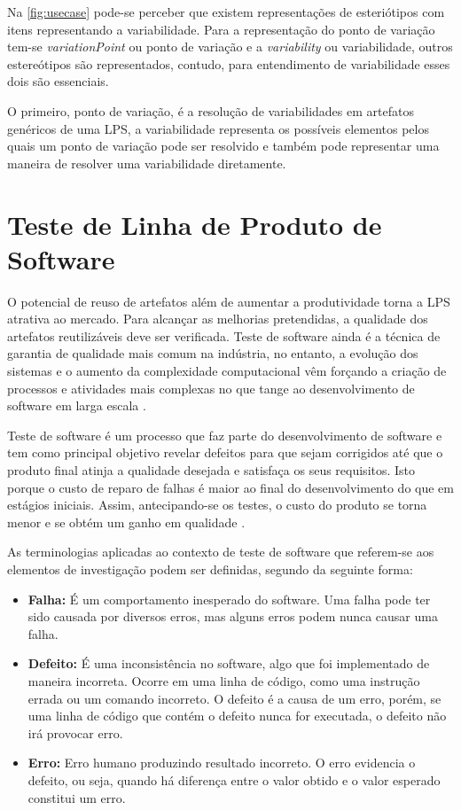 Na \ref{fig:usecase} pode-se perceber que existem representações de esteriótipos com itens representando a variabilidade. Para a representação do ponto de variação tem-se \textit{variationPoint} ou ponto de variação e a \textit{variability} ou variabilidade, outros estereótipos são representados, contudo, para entendimento de variabilidade esses dois são essenciais.

O primeiro, ponto de variação, é a resolução de variabilidades em artefatos genéricos de uma LPS, a variabilidade representa os possíveis elementos pelos quais um ponto de variação pode ser resolvido e também pode representar uma maneira de resolver uma variabilidade diretamente.    



\section{Teste de Linha de Produto de Software}
\label{cap2sec:teste_lps}

O potencial de reuso de artefatos além de aumentar a produtividade torna a LPS atrativa ao mercado. Para alcançar as melhorias pretendidas, a qualidade dos artefatos reutilizáveis deve ser verificada. Teste de software ainda é a técnica de garantia de qualidade mais comum na indústria, no entanto, a evolução dos sistemas e o aumento da complexidade computacional vêm forçando a criação de processos e atividades mais complexas no que tange ao desenvolvimento de software em larga escala \cite{Apel:2013:FSP:2541773}. 

Teste de software é um processo que faz parte do desenvolvimento de software e tem como principal objetivo revelar defeitos para que sejam corrigidos até que o produto final atinja a qualidade desejada e satisfaça os seus requisitos. Isto porque o custo de reparo de falhas é maior ao final do desenvolvimento do que em estágios iniciais. Assim, antecipando-se os testes, o custo do produto se torna menor e se obtém um ganho em qualidade \cite{do2014strategies}.


As terminologias aplicadas ao contexto de teste de software que referem-se aos elementos de investigação podem ser definidas, segundo \citet{delamaro2017introduccao} da seguinte forma:


\begin{itemize}
	\item \textbf{Falha:} É um comportamento inesperado do software. Uma falha pode ter sido causada por diversos erros, mas alguns erros podem nunca causar uma falha.
	\item \textbf{Defeito:} É uma inconsistência no software, algo que foi implementado de maneira incorreta. Ocorre em uma linha de código, como uma instrução errada ou um comando incorreto. O defeito é a causa de um erro, porém, se uma linha de código que contém o defeito nunca for executada, o defeito não irá provocar erro.
	\item \textbf{Erro:} Erro humano produzindo resultado incorreto. O erro evidencia o defeito, ou seja, quando há diferença entre o valor obtido e o valor esperado constitui um erro.
\end{itemize}


